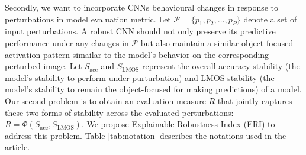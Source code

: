 \documentclass[a4paper,fleqn]{cas-dc}
\begin{document}
	Secondly, we want to incorporate CNNs behavioural changes in response to perturbations in model evaluation metric. 
	Let $\mathcal{P}=\{p_1,p_2,\ldots,p_P\}$ denote a set of input perturbations. 
	A robust CNN should not only preserve its predictive performance under any changes in $\mathcal{P}$ but also maintain a similar object-focused activation pattern simailar to the model's behavior on the corresponding perturbed image. 
	Let $S_{\mathrm{acc}}$ and $S _ {\mathrm{LMOS}}$ represent the overall accuracy stability (the model's stability to perform under purturbation) and LMOS stability (the model's stability to remain the object-focused for making predictions) of a model. 
	Our second problem is to obtain an evaluation measure $R$ that jointly captures these two forms of stability across the evaluated perturbations: $R = \Phi(S_{\mathrm{acc}},  S_{\mathrm{LMOS}})$. 
	We propose Explainable Robustness Index (ERI) to address this problem. 
	Table \ref{tab:notation} describes the notations used in the article. 
    
	
	

    
\end{document}
